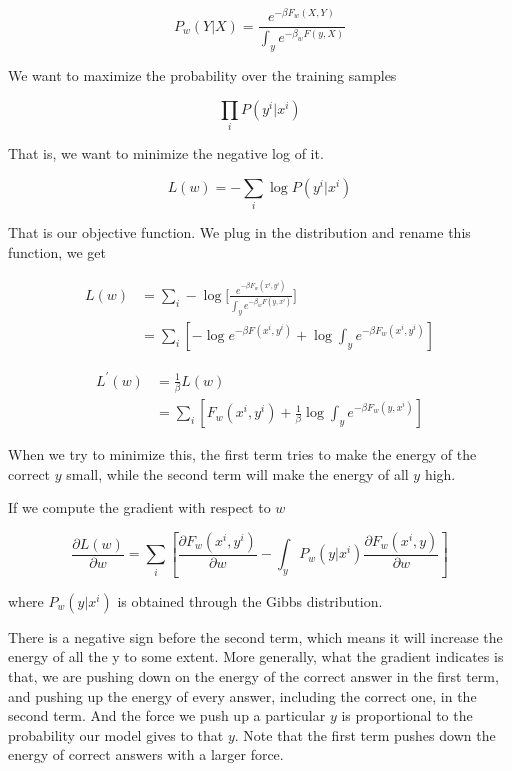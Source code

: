 \begin{equation*}
    P_w(Y|X) = \frac{e^{-\beta F_w(X,Y)}}{\int_y e^{-\beta_w F(y,X)}}
\end{equation*}

We want to maximize the probability over the training samples

\begin{equation*}
    \prod_{i} P(y^i|x^i)
\end{equation*}

That is, we want to minimize the negative log of it.

\begin{equation*}
    L(w) = -\sum_i \log P(y^i | x^i)
\end{equation*}

That is our objective function. We plug in the distribution and rename this function, we get

\begin{equation*}
    \begin{split}
        L(w) & = \sum_i -\log \bigg\lbrack\frac{e^{-\beta F_w(x^i,y^i)}}{\int_y e^{-\beta_w F(y,x^i)}}\bigg\rbrack \\
        & = \sum_i [-\log e^{-\beta F(x^i,y^i)} + \log\int_y e^{-\beta F_w(x^i,y^i)}]
    \end{split}
\end{equation*}

\begin{equation*}
    \begin{split}
        L^{'}(w) & = \frac{1}{\beta}L(w) \\
        & = \sum_i [F_w (x^i,y^i) + \frac{1}{\beta}\log\int_y e^{-\beta F_w(y,x^i)}]
    \end{split}
\end{equation*}

When we try to minimize this, the first term tries to make the energy of the correct $y$ small, while the second term will make the energy of all $y$ high. 

If we compute the gradient with respect to $w$

\begin{equation*}
    \frac{\partial L(w)}{\partial w} = \sum_{i} [\frac{\partial F_{w}(x^i,y^i)}{\partial w} - \int_y P_{w}(y|x^i)\frac{\partial F_w(x^i,y)}{\partial w}]
\end{equation*}

where $P_w(y|x^i)$ is obtained through the Gibbs distribution.

There is a negative sign before the second term, which means it will increase the energy of all the y to some extent. 
More generally, what the gradient indicates is that, we are pushing down on the energy of the correct answer in the first term, and pushing up the energy of every answer, including the correct one, in the second term. 
And the force we push up a particular $y$ is proportional to the probability our model gives to that $y$. Note that the first term pushes down the energy of correct answers with a larger force.

